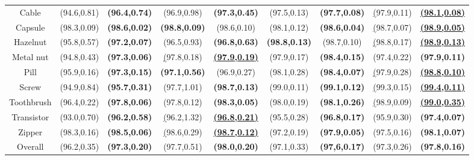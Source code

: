 \documentclass[letterpaper]{article}
\begin{document}
\begin{table*}[t]
\begin{tabular}{c|cc|cc|cc|cc}
Cable      & (94.6,0.81)          & \textbf{(96.4,0.74)} & (96.9,0.98)          & \textbf{(97.3,0.45)}       & (97.5,0.13)          & \textbf{(97.7,0.08)}       & {\ul (97.9,0.11)}    & {\ul \textbf{(98.1,0.08)}} \\
Capsule    & (98.3,0.09)          & \textbf{(98.6,0.02)} & \textbf{(98.8,0.09)} & (98.6,0.10)                & (98.1,0.12)          & \textbf{(98.6,0.04)}       & {\ul (98.7,0.07)}    & {\ul \textbf{(98.9,0.05)}} \\
Hazelnut   & (95.8,0.57)          & \textbf{(97.2,0.07)} & (96.5,0.93)          & \textbf{(96.8,0.63)}       & \textbf{(98.8,0.13)} & (98.7,0.10)                & {\ul (98.8,0.17)}    & {\ul \textbf{(98.9,0.13)}} \\
Metal nut  & (94.8,0.43)          & \textbf{(97.3,0.06)} & {\ul (97.8,0.18)}    & {\ul \textbf{(97.9,0.19)}} & (97.9,0.17)          & \textbf{(98.4,0.15)}       & (97.4,0.22)          & \textbf{(97.9,0.11)}       \\
Pill       & (95.9,0.16)          & \textbf{(97.3,0.15)} & \textbf{(97.1,0.56)} & (96.9,0.27)                & (98.1,0.28)          & \textbf{(98.4,0.07)}       & {\ul (97.9,0.28)}    & {\ul \textbf{(98.8,0.10)}} \\
Screw      & (94.9,0.84)          & \textbf{(95.7,0.31)} & (97.7,1.01)          & \textbf{(98.7,0.13)}       & (99.0,0.11)          & \textbf{(99.1,0.12)}       & {\ul (99.3,0.15)}    & {\ul \textbf{(99.4,0.11)}} \\
Toothbrush & (96.4,0.22)          & \textbf{(97.8,0.06)} & (97.8,0.12)          & \textbf{(98.3,0.05)}       & (98.0,0.19)          & \textbf{(98.1,0.26)}       & {\ul (98.9,0.09)}    & {\ul \textbf{(99.0,0.35)}} \\
Transistor & (93.0,0.70)          & \textbf{(96.2,0.58)} & {\ul (96.2,1.32)}    & {\ul \textbf{(96.8,0.21)}} & (95.5,0.28)          & \textbf{(96.8,0.17)}       & (95.9,0.30)          & \textbf{(97.4,0.07)}       \\
Zipper     & (98.3,0.16)          & \textbf{(98.5,0.06)} & {\ul (98.6,0.29)}    & {\ul \textbf{(98.7,0.12)}} & (97.2,0.19)          & \textbf{(97.9,0.05)}       & (97.5,0.16)          & \textbf{(98.1,0.07)}       \\ \hline
Overall    & (96.2,0.35)          & \textbf{(97.3,0.20)} & (97.7,0.51)          & \textbf{(98.0,0.20)}       & (97.1,0.33)          & \textbf{(97,6,0.17)}       & (97.3,0.26)          & \textbf{(97.8,0.16)}       \\ \hline
\end{tabular}

\end{table*}
\end{document}
